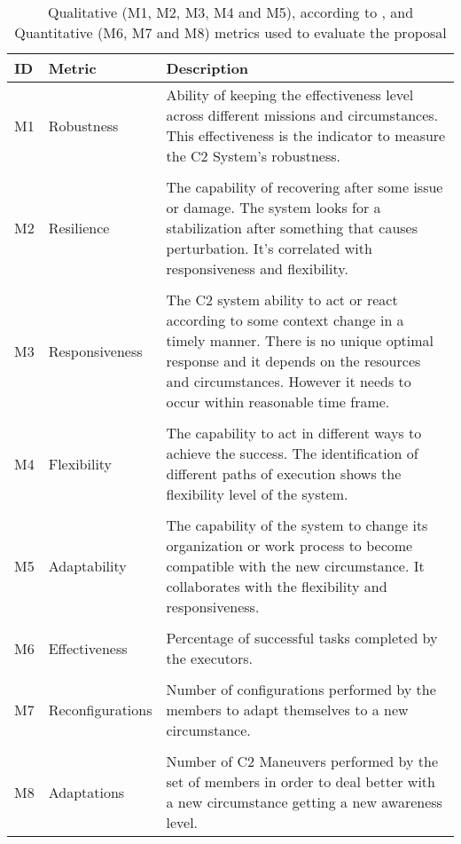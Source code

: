 \begin{table}[ht!]
	\small
	\fontsize{10}{10}\selectfont
	\centering
	\caption{Qualitative (M1, M2, M3, M4 and M5), according to \cite{CC01}, and Quantitative (M6, M7 and M8) metrics used to evaluate the proposal}
	\label{table:metrics}
	
	\begin{tabularx}{\textwidth}{llX}
	\hline
		\textbf{ID}
		& \textbf{Metric}
		& \textbf{Description} \\ [1ex]
	\hline	
	
	M1 & Robustness & Ability of keeping the effectiveness level across different missions and circumstances. This effectiveness is the indicator to measure the C2 System's robustness.
	\\[1ex] \\
	
	M2 & Resilience & The capability of recovering after some issue or damage. The system looks for a stabilization after something that causes perturbation. It's correlated with responsiveness and flexibility.  
	\\[1ex] \\
	
	M3 & Responsiveness & The C2 system ability to act or react according to some context change in a timely manner. There is no unique optimal response and it depends on the resources and circumstances. However it needs to occur within reasonable time frame.
	\\[1ex] \\
	
	M4 & Flexibility & The capability to act in different ways to achieve the success. The identification of different paths of execution shows the flexibility level of the system. 
	\\[1ex] \\
	
	M5 & Adaptability & The capability of the system to change its organization or work process to become compatible with the new circumstance. It collaborates with the flexibility and responsiveness.
	\\[1ex] \\
	
	M6 & Effectiveness & Percentage of successful tasks completed by the executors.
	\\[1ex] \\
	
	M7 & Reconfigurations & Number of configurations performed by the members to adapt themselves to a new circumstance.
	\\[1ex] \\
	
	M8 & Adaptations & Number of C2 Maneuvers performed by the set of members in order to deal better with a new circumstance getting a new awareness level.
	\\[1ex]
	\hline
	\end{tabularx}
\end{table} 